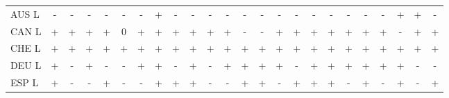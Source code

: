 \documentclass[12pt,bibliography=totoc]{article}
\begin{document}
\begin{appendices}
\begin{table}[H]
\begin{tabular}{l  cccccccc@{\hskip 0.2in}  cccccccc@{\hskip 0.2in}   ccccccc}
AUS L	&\cellcolor{red!25}-	&\cellcolor{red!25}-	&\cellcolor{red!25}-	&\cellcolor{red!25}-	&\cellcolor{red!25}-	&\cellcolor{red!25}-	&\cellcolor{green!25}+	&\cellcolor{red!25}-	&\cellcolor{red!25}-	&\cellcolor{red!25}-	&\cellcolor{red!25}-	&\cellcolor{red!25}-	&\cellcolor{red!25}-	&\cellcolor{red!25}-	&\cellcolor{red!25}-	&\cellcolor{red!25}-	&\cellcolor{red!25}-	&\cellcolor{red!25}-	&\cellcolor{red!25}-	&\cellcolor{red!25}-	&\cellcolor{green!25}+	&\cellcolor{green!25}+	&\cellcolor{red!25}-\\
CAN L	&\cellcolor{green!25}+	&\cellcolor{green!25}+	&\cellcolor{green!25}+	&\cellcolor{green!25}+	&\cellcolor{yellow!25}0	&\cellcolor{green!25}+	&\cellcolor{green!25}+	&\cellcolor{green!25}+	&\cellcolor{green!25}+	&\cellcolor{green!25}+	&\cellcolor{green!25}+	&\cellcolor{red!25}-	&\cellcolor{red!25}-	&\cellcolor{green!25}+	&\cellcolor{green!25}+	&\cellcolor{green!25}+	&\cellcolor{green!25}+	&\cellcolor{green!25}+	&\cellcolor{green!25}+	&\cellcolor{green!25}+	&\cellcolor{red!25}-	&\cellcolor{green!25}+	&\cellcolor{green!25}+\\
CHE L	&\cellcolor{green!25}+	&\cellcolor{green!25}+	&\cellcolor{green!25}+	&\cellcolor{green!25}+	&\cellcolor{green!25}+	&\cellcolor{green!25}+	&\cellcolor{green!25}+	&\cellcolor{green!25}+	&\cellcolor{green!25}+	&\cellcolor{green!25}+	&\cellcolor{green!25}+	&\cellcolor{green!25}+	&\cellcolor{green!25}+	&\cellcolor{green!25}+	&\cellcolor{green!25}+	&\cellcolor{green!25}+	&\cellcolor{green!25}+	&\cellcolor{green!25}+	&\cellcolor{green!25}+	&\cellcolor{green!25}+	&\cellcolor{green!25}+	&\cellcolor{green!25}+	&\cellcolor{green!25}+\\
DEU L	&\cellcolor{green!25}+	&\cellcolor{red!25}-	&\cellcolor{green!25}+	&\cellcolor{red!25}-	&\cellcolor{red!25}-	&\cellcolor{green!25}+	&\cellcolor{green!25}+	&\cellcolor{red!25}-	&\cellcolor{green!25}+	&\cellcolor{red!25}-	&\cellcolor{green!25}+	&\cellcolor{green!25}+	&\cellcolor{green!25}+	&\cellcolor{green!25}+	&\cellcolor{red!25}-	&\cellcolor{green!25}+	&\cellcolor{green!25}+	&\cellcolor{green!25}+	&\cellcolor{green!25}+	&\cellcolor{green!25}+	&\cellcolor{green!25}+	&\cellcolor{red!25}-	&\cellcolor{red!25}-\\
ESP L	&\cellcolor{green!25}+	&\cellcolor{red!25}-	&\cellcolor{red!25}-	&\cellcolor{green!25}+	&\cellcolor{red!25}-	&\cellcolor{red!25}-	&\cellcolor{green!25}+	&\cellcolor{green!25}+	&\cellcolor{green!25}+	&\cellcolor{red!25}-	&\cellcolor{red!25}-	&\cellcolor{green!25}+	&\cellcolor{green!25}+	&\cellcolor{red!25}-	&\cellcolor{green!25}+	&\cellcolor{green!25}+	&\cellcolor{green!25}+	&\cellcolor{red!25}-	&\cellcolor{green!25}+	&\cellcolor{red!25}-	&\cellcolor{green!25}+	&\cellcolor{red!25}-	&\cellcolor{green!25}+\\

\end{tabular}
\end{table}
\end{appendices}
\end{document}
